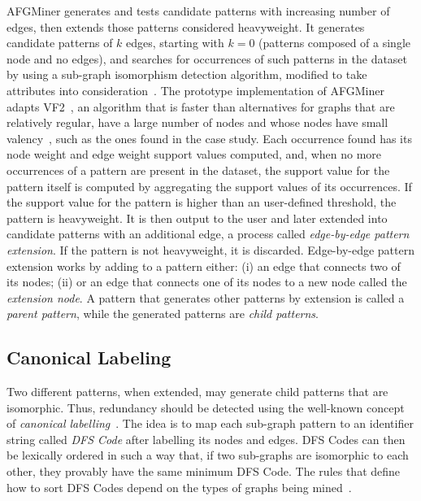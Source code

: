 AFGMiner generates and tests candidate patterns with increasing number of edges, then extends those patterns considered heavyweight. It generates candidate patterns of $k$ edges, starting with $k = 0$ (patterns composed of a single node and no edges), and searches for occurrences of such patterns in the dataset by using a sub-graph isomorphism detection algorithm, modified to take attributes into consideration~\cite{GomesMSc12}. The prototype implementation of AFGMiner adapts VF2~\cite{Cordella}, an algorithm that is faster than alternatives for graphs that are relatively regular, have a large number of nodes and whose nodes have small valency~\cite{Foggia}, such as the ones found in the case study. Each occurrence found has its node weight and edge weight support values computed, and, when no more occurrences of a pattern are present in the dataset, the support value for the pattern itself is computed by aggregating the support values of its occurrences. If the support value for the pattern is higher than an user-defined threshold, the pattern is heavyweight. It is then output to the user and later extended into candidate patterns with an additional edge, a process called \emph{edge-by-edge pattern extension}. If the pattern is not heavyweight, it is discarded. Edge-by-edge pattern extension works by adding to a pattern either: (i) an edge that connects two of its nodes; (ii) or an edge that connects one of its nodes to a new node called the \emph{extension node}. A pattern that generates other patterns by extension is called a \emph{parent pattern}, while the generated patterns are \emph{child patterns}.

\subsection{Canonical Labeling}
Two different patterns, when extended, may generate child patterns that are isomorphic. Thus, redundancy should be detected using the well-known concept of \emph{canonical labelling}~\cite{gSpan}. The idea is to map each sub-graph pattern to an identifier string called \emph{DFS Code} after labelling its nodes and edges. DFS Codes can then be lexically ordered in such a way that, if two sub-graphs are isomorphic to each other, they provably have the same minimum DFS Code. The rules that define how to sort DFS Codes depend on the types of graphs being mined~\cite{GomesMSc12}.

